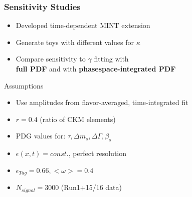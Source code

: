 \documentclass{beamer}
\begin{document}
%
%	
%	



\begin{frame}
	\frametitle{Sensitivity Studies}

	\centering
	
	\begin{block}{}
	\begin{itemize}
		\item  Developed time-dependent MINT extension
		\item Generate toys with different values for $\kappa$ 
		\item Compare sensitivity to $\gamma$ fitting with \\ \textbf{full PDF} and with \textbf{phasespace-integrated PDF}
		\end{itemize}
	\end{block}		
		
	\begin{block}{Assumptions}
	\begin{itemize}	
		\item Use amplitudes from flavor-averaged, time-integrated fit
		\item $r = 0.4$ (ratio of CKM elements) 
		\item PDG values for: $\tau,\Delta m_s, \Delta \Gamma, \beta_s$
		\item $\epsilon(x,t) = const.$, perfect resolution  
		\item $\epsilon_{Tag} = 0.66, <\omega> = 0.4 $   
		\item $N_{signal} = 3000$ (Run1+15/16 data)		 
	\end{itemize}
	\end{block}	
			

\end{frame}
\end{document}
